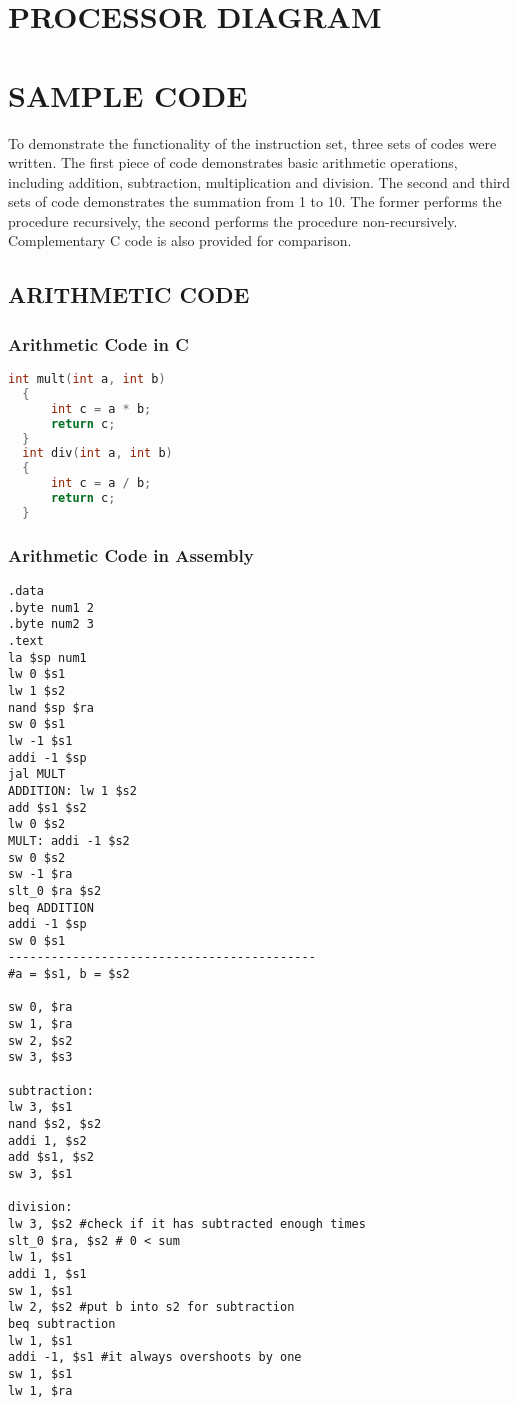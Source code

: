 \documentclass[11pt, titlepage]{article}
\begin{document}
\newpage
\section{PROCESSOR DIAGRAM}

\newpage
\section{SAMPLE CODE}
To demonstrate the functionality of the instruction set, three sets of codes were written. The first piece of code demonstrates basic arithmetic operations, including addition, subtraction, multiplication and division. The second and third sets of code demonstrates the summation from 1 to 10. The former performs the procedure recursively, the second performs the procedure non-recursively. Complementary C code is also provided for comparison.  

\subsection{ARITHMETIC CODE}
\subsubsection{Arithmetic Code in C}
\begin{lstlisting}[language = C]
int mult(int a, int b)
  {
      int c = a * b;
      return c;
  }
  int div(int a, int b)
  {
      int c = a / b;
      return c;
  }
\end{lstlisting}
\subsubsection{Arithmetic Code in Assembly}
\begin{lstlisting}[language=Ant]
.data 
.byte num1 2
.byte num2 3
.text
la $sp num1
lw 0 $s1
lw 1 $s2
nand $sp $ra
sw 0 $s1
lw -1 $s1
addi -1 $sp 
jal MULT
ADDITION: lw 1 $s2  
add $s1 $s2
lw 0 $s2
MULT: addi -1 $s2
sw 0 $s2
sw -1 $ra
slt_0 $ra $s2
beq ADDITION
addi -1 $sp
sw 0 $s1
-------------------------------------------
#a = $s1, b = $s2

sw 0, $ra
sw 1, $ra
sw 2, $s2
sw 3, $s3

subtraction:
lw 3, $s1
nand $s2, $s2
addi 1, $s2
add $s1, $s2
sw 3, $s1

division:
lw 3, $s2 #check if it has subtracted enough times
slt_0 $ra, $s2 # 0 < sum
lw 1, $s1
addi 1, $s1
sw 1, $s1
lw 2, $s2 #put b into s2 for subtraction
beq subtraction
lw 1, $s1
addi -1, $s1 #it always overshoots by one
sw 1, $s1
lw 1, $ra

\end{lstlisting}
\end{document}
